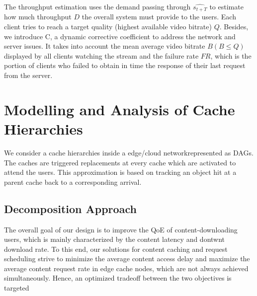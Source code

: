 The throughput estimation uses the demand passing through $\widehat{s_{t+T}}$ to estimate how much throughput $D$ the overall system must provide to the users. Each client tries to reach a target quality (highest available video bitrate) $Q$. 
Besides, we introduce C, a dynamic corrective coefficient to address the network and server issues. It takes into account the mean average video bitrate $B (B \leqslant Q)$ displayed by all clients watching the stream and the failure rate $FR$, which is the portion of clients who failed to obtain in time the response of their last request from the server.

\section{Modelling and Analysis of Cache Hierarchies}
\label{sec:mechanism}

We consider a cache hierarchies inside a edge/cloud networkrepresented as DAGs. The caches are triggered replacements at every cache which are activated to attend the users. This approximation is based on tracking an object hit at a parent cache back to a corresponding arrival.

\subsection{Decomposition Approach}

The overall goal of our design is to improve the QoE of content-downloading users, which is mainly characterized by the content latency and dontwnt download rate. To this end, our solutions for content caching and request scheduling strive to minimize the average content access delay and maximize the average content request rate in edge cache nodes, which are not always achieved simultaneously. Hence, an optimized tradeoff between the two objectives is targeted

